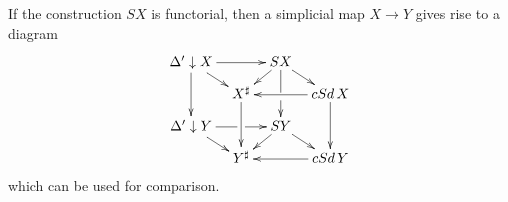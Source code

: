 If the construction $SX$ is functorial, then a simplicial map $X\to Y$ gives rise to a diagram
\begin{equation}
\label{eq:comparison_diagram_simplex_categories}
\begin{gathered}
\xymatrix@=0.8em{
\Delta '\downarrow X \ar[dd] \ar[rr] \ar[dr] && SX \ar[ld] \ar@{-}[d] \ar[dr] \\
& X^\sharp \ar[dd] & \ar[d] & cSd\, X \ar[ll] \ar[dd] \\
\Delta '\downarrow Y \ar[dr] \ar@{-}[r] & \ar[r] & SY \ar[ld] \ar[dr] \\
& Y^\sharp && cSd\, Y \ar[ll]
}
\end{gathered}
\end{equation}
which can be used for comparison.


